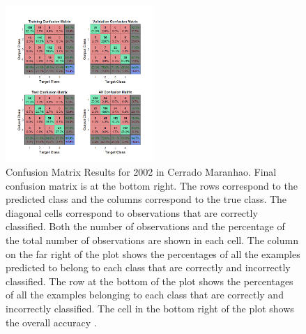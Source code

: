 \chapter{}

\begin{figure}[h]
 \centering
\includegraphics[width=0.5\textwidth]{Chapter2/2002_CM_Fev_MA.png}
\caption[Confusion Matrix Results for 2002 in Cerrado Maranhao]{Confusion Matrix Results for 2002 in Cerrado Maranhao. Final confusion matrix is at the bottom right. The rows correspond to the predicted class and the columns correspond to the true class. The diagonal cells correspond to observations that are correctly classified. Both the number of observations and the percentage of the total number of observations are shown in each cell. The column on the far right of the plot shows the percentages of all the examples predicted to belong to each class that are correctly and incorrectly classified. The row at the bottom of the plot shows the percentages of all the examples belonging to each class that are correctly and incorrectly classified. The cell in the bottom right of the plot shows the overall accuracy \citep{matlab_2017}.}
\end{figure}



